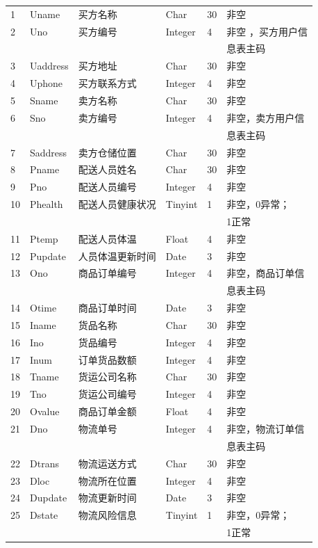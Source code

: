 \documentclass[12pt]{article}
\begin{document}
\begin{center}
\begin{supertabular}{llllll}
	1 &	Uname &	买方名称 &	Char &	30 &	非空 \\
	2 &	Uno &	买方编号 &	Integer & 4 &	非空 ，买方用户信  \\ &&&&& 息表主码\\
	3 &	Uaddress &	买方地址 &	Char &	30 &	非空 \\
	4 &	Uphone &	买方联系方式 &	Integer &	4 &	非空 \\
	5 &	Sname &	卖方名称 &	Char &	30 	& 非空\\
	6 &	Sno &	卖方编号 &	Integer &	4 	& 非空，卖方用户信 \\ &&&&& 息表主码 \\
	7 &	Saddress &	卖方仓储位置 &	Char &	30 	& 非空 \\
	8 &	Pname &	配送人员姓名 &	Char &	30 &	非空 \\
	9 &	Pno &	配送人员编号 &	Integer &	4 &	非空\\
	10 &	Phealth &	配送人员健康状况 &	Tinyint &	1 &	非空，0异常； \\ &&&&& 1正常\\
	11  &	Ptemp &	配送人员体温 &	Float &	4 &	非空 \\
	12 &	Pupdate &	人员体温更新时间 &	Date &	3 &	非空 \\
	13 &	Ono &	商品订单编号 &	Integer &	4 &	非空，商品订单信 \\ &&&&& 息表主码\\
	14 &	Otime &	商品订单时间 &	Date &	3 &	非空 \\
	15 &	Iname 	& 货品名称 &	Char &	30 &	非空 \\
	16 &	Ino &	货品编号 &	Integer &	4 &	非空 \\
	17 &	Inum &	订单货品数额 &	Integer &	4 &	非空 \\
	18 &	Tname &	货运公司名称 &	Char &	30 	& 非空 \\
	19 &	Tno &	货运公司编号 &	 Integer &	4 &	非空 \\
	20 &	Ovalue 	& 商品订单金额 	& Float &	4 &	非空 \\
	21 & Dno &	物流单号 &	Integer &	4 &	非空，物流订单信 \\ &&&&& 息表主码 \\
	22 &	Dtrans &	物流运送方式 &	Char &	30 &	非空 \\
	23 &	Dloc &	物流所在位置 &	Integer &	4 &	非空 \\
	24 &	Dupdate &	物流更新时间 &	Date &	3 &	非空 \\
	25 &	Dstate &	物流风险信息 &	Tinyint &	1 &	非空，0异常； \\ &&&&& 1正常\\

\end{supertabular}
\end{center}
\end{document}
